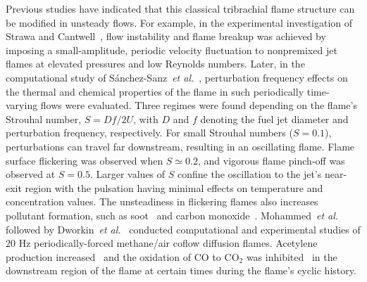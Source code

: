 \documentclass[review,3p,times]{elsarticle}
\begin{document}
Previous studies have indicated that this classical tribrachial flame structure can be modified in unsteady flows.  For example, in the experimental investigation of Strawa and Cantwell~\cite{strawa89}, flow instability and flame breakup was achieved by imposing a small-amplitude, periodic velocity fluctuation to nonpremixed jet flames at elevated pressures and low Reynolds numbers.  Later, in the computational study of S\'{a}nchez-Sanz~\emph{et al.}~\cite{sanchezsanz10}, perturbation frequency effects on the thermal and chemical properties of the flame in such periodically time-varying flows were evaluated.  Three regimes were found depending on the flame's Strouhal number, $S = Df/2U$, with $D$ and $f$ denoting the fuel jet diameter and perturbation frequency, respectively.  For small Strouhal numbers ($S = 0.1$), perturbations can travel far downstream, resulting in an oscillating flame.  Flame surface flickering was observed when $S\simeq 0.2$, and vigorous flame pinch-off was observed at $S = 0.5$.  Larger values of $S$ confine the oscillation to the jet's near-exit region with the pulsation having minimal effects on temperature and concentration values.  The unsteadiness in flickering flames also increases pollutant formation, such as soot~\cite{shaddix94} and carbon monoxide~\cite{skaggs96}.  Mohammed~\emph{et al.}~\cite{mohammed98} followed by Dworkin~\emph{et al.}~\cite{dworkin07} conducted computational and experimental studies of $20$ Hz periodically-forced methane/air coflow diffusion flames.  Acetylene production increased~\cite{mohammed98} and the oxidation of CO to CO$_2$ was inhibited~\cite{dworkin07} in the downstream region of the flame at certain times during the flame's cyclic history.       
\end{document}
